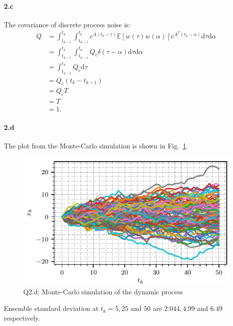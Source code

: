 \paragraph{2.c}The covariance of discrete process noise is:
\begin{align*}
	Q &= \int_{t_{k-1}}^{t_k}\int_{t_{k-1}}^{t_k}e^{A(t_k-\tau)}\mathbb{E}[w(\tau)w(\alpha)]e^{A^T(t_k-\alpha)}\text{d}\tau\text{d}\alpha\\
	&= \int_{t_{k-1}}^{t_k}\int_{t_{k-1}}^{t_k} Q_c \delta(\tau-\alpha)\text{d}\tau\text{d}\alpha\\
	&= \int_{t_{k-1}}^{t_k}Q_c\text{d}\tau\\
	&= Q_c(t_k-t_{k-1})\\
	&= Q_cT\\
	&= T\\
	&= 1.
\end{align*}
\paragraph{2.d}The plot from the Monte-Carlo simulation is shown in Fig.~\ref{fig:q2_d}.
\begin{figure}[h]
	\centering
	\includegraphics[scale=1.0,trim={0cm 0cm 0cm 0cm},clip]{./code/generatedPlots/q2_d.pdf}
	\caption{Q2.d: Monte-Carlo simulation of the dynamic process}
	\label{fig:q2_d}
\end{figure}
Ensemble standard deviation at $t_k=5,25$ and $50$ are $2.044, 4.99$ and $6.49$ respectively.
